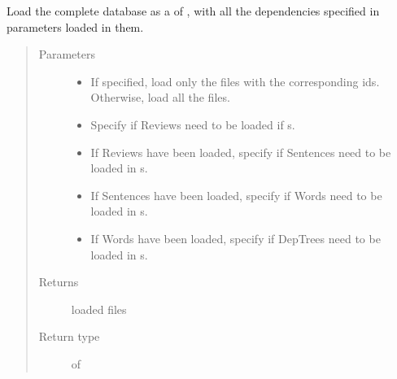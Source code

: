 \documentclass[letterpaper,10pt,english]{sphinxmanual}
\begin{document}

\begin{fulllineitems}
\label{\detokenize{load:loacore.load.file_load.load_database}}
Load the complete database as a  of  , with all the dependencies specified in parameters
loaded in them.
\begin{quote}\begin{description}
\item[{Parameters}] \leavevmode\begin{itemize}
\item {} 
 \textendash{} If specified, load only the files with the corresponding ids. Otherwise, load all the files.

\item {} 
 \textendash{} Specify if Reviews need to be loaded if  s.

\item {} 
 \textendash{} If Reviews have been loaded, specify if Sentences need to be loaded in  s.

\item {} 
 \textendash{} If Sentences have been loaded, specify if Words need to be loaded in  s.

\item {} 
 \textendash{} If Words have been loaded, specify if DepTrees need to be loaded in  s.

\end{itemize}

\item[{Returns}] \leavevmode
loaded files

\item[{Return type}] \leavevmode
{} of 


\end{description}
\end{quote}
\end{fulllineitems}
\end{document}
